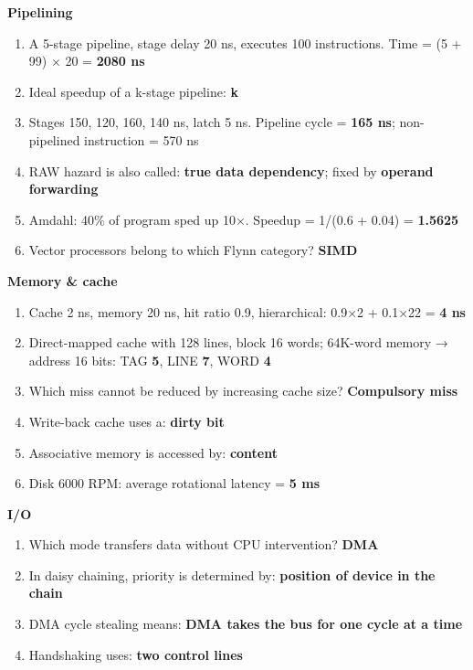 \textbf{Pipelining}

\begin{enumerate}
\def\labelenumi{\arabic{enumi}.}
\setcounter{enumi}{21}
\tightlist
\item
  A 5-stage pipeline, stage delay 20 ns, executes 100 instructions. Time = (5 + 99) × 20 = \textbf{2080 ns}
\item
  Ideal speedup of a k-stage pipeline: \textbf{k}
\item
  Stages 150, 120, 160, 140 ns, latch 5 ns. Pipeline cycle = \textbf{165 ns}; non-pipelined instruction = 570 ns
\item
  RAW hazard is also called: \textbf{true data dependency}; fixed by \textbf{operand forwarding}
\item
  Amdahl: 40\% of program sped up 10×. Speedup = 1/(0.6 + 0.04) = \textbf{1.5625}
\item
  Vector processors belong to which Flynn category? \textbf{SIMD}
\end{enumerate}

\textbf{Memory \& cache}

\begin{enumerate}
\def\labelenumi{\arabic{enumi}.}
\setcounter{enumi}{27}
\tightlist
\item
  Cache 2 ns, memory 20 ns, hit ratio 0.9, hierarchical: 0.9×2 + 0.1×22 = \textbf{4 ns}
\item
  Direct-mapped cache with 128 lines, block 16 words; 64K-word memory → address 16 bits: TAG \textbf{5}, LINE \textbf{7}, WORD \textbf{4}
\item
  Which miss cannot be reduced by increasing cache size? \textbf{Compulsory miss}
\item
  Write-back cache uses a: \textbf{dirty bit}
\item
  Associative memory is accessed by: \textbf{content}
\item
  Disk 6000 RPM: average rotational latency = \textbf{5 ms}
\end{enumerate}

\textbf{I/O}

\begin{enumerate}
\def\labelenumi{\arabic{enumi}.}
\setcounter{enumi}{33}
\tightlist
\item
  Which mode transfers data without CPU intervention? \textbf{DMA}
\item
  In daisy chaining, priority is determined by: \textbf{position of device in the chain}
\item
  DMA cycle stealing means: \textbf{DMA takes the bus for one cycle at a time}
\item
  Handshaking uses: \textbf{two control lines}
\end{enumerate}

